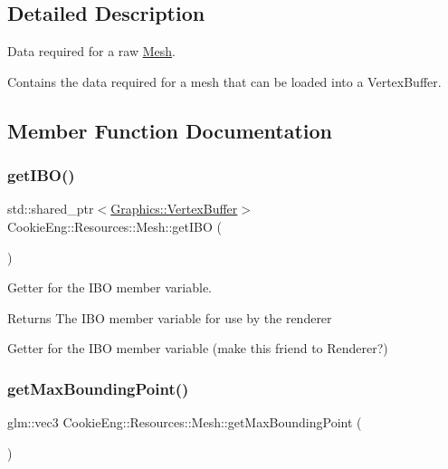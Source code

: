 \subsection{Detailed Description}
Data required for a raw \hyperlink{struct_cookie_eng_1_1_resources_1_1_mesh}{Mesh}. 

Contains the data required for a mesh that can be loaded into a Vertex\+Buffer. 

\subsection{Member Function Documentation}
\mbox{\label{struct_cookie_eng_1_1_resources_1_1_mesh_a322630a222821c217f45b38c25fafc3a}} 
\subsubsection{\texorpdfstring{get\+I\+B\+O()}{getIBO()}}
{\footnotesize\ttfamily std\+::shared\+\_\+ptr$<$\hyperlink{class_cookie_eng_1_1_graphics_1_1_vertex_buffer}{Graphics\+::\+Vertex\+Buffer}$>$ Cookie\+Eng\+::\+Resources\+::\+Mesh\+::get\+I\+BO (\begin{DoxyParamCaption}{ }\end{DoxyParamCaption})\hspace{0.3cm}{\ttfamily [inline]}}



Getter for the I\+BO member variable. 

\begin{DoxyReturn}{Returns}
The I\+BO member variable for use by the renderer
\end{DoxyReturn}
Getter for the I\+BO member variable (make this friend to Renderer?) \mbox{\label{struct_cookie_eng_1_1_resources_1_1_mesh_a350bb13cf073b1367212e95060b0eb64}} 
\subsubsection{\texorpdfstring{get\+Max\+Bounding\+Point()}{getMaxBoundingPoint()}}
{\footnotesize\ttfamily glm\+::vec3 Cookie\+Eng\+::\+Resources\+::\+Mesh\+::get\+Max\+Bounding\+Point (\begin{DoxyParamCaption}{ }\end{DoxyParamCaption})\hspace{0.3cm}{\ttfamily [inline]}}



